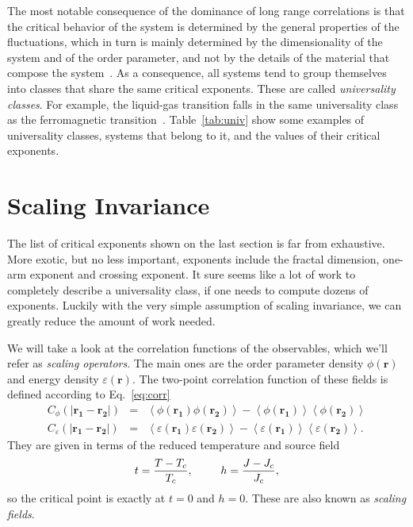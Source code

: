 The most notable consequence of the dominance of long range correlations is
that the critical behavior of the system is determined by the general
properties of the fluctuations, which in turn is mainly determined by the
dimensionality of the system and of the order parameter, and not by the details
of the material that compose the system~\cite{Stanley1999}. As a consequence,
all systems tend to group themselves into classes that share the same critical
exponents. These are called \textit{universality classes}. For example, the
liquid-gas transition falls in the same universality class as the ferromagnetic
transition~\cite{Kim1984}. Table~\ref{tab:univ} show some examples of
universality classes, systems that belong to it, and the values of their
critical exponents.




\section{Scaling Invariance}
\label{sec:scaling}
\renewcommand{\op}{\phi}

The list of critical exponents shown on the last section is far from
exhaustive. More exotic, but no less important, exponents include the fractal
dimension, one-arm exponent and crossing exponent. It sure seems like a lot of
work to completely describe a universality class, if one needs to compute
dozens of exponents. Luckily with the very simple assumption of scaling
invariance, we can greatly reduce the amount of work needed.

We will take a look at the correlation functions of the observables, which
we'll refer as \textit{scaling operators}. The main ones are the order
parameter density $\op(\mathbf{r})$ and energy density
$\varepsilon(\mathbf{r})$. The two-point correlation function of these fields is
defined according to Eq.~\ref{eq:corr}
\begin{eqnarray}
    C_{\op}\left(\left|\mathbf{r_1}-\mathbf{r_2}\right|\right) & = &
    \left\langle
        \op\left(\mathbf{r_{1}}\right)
        \op\left(\mathbf{r_{2}}\right)
    \right\rangle -
    \left\langle
        \op\left(\mathbf{r_{1}}\right)
    \right\rangle
    \left\langle
        \op\left(\mathbf{r_{2}}\right)
    \right\rangle
    \\
    C_{\varepsilon}\left(\left|\mathbf{r_1}-\mathbf{r_2}\right|\right) & = &
    \left\langle
        \varepsilon\left(\mathbf{r_{1}}\right)
        \varepsilon\left(\mathbf{r_{2}}\right)
    \right\rangle-
    \left\langle
        \varepsilon\left(\mathbf{r_{1}}\right)
    \right\rangle
    \left\langle
        \varepsilon\left(\mathbf{r_{2}}\right)
    \right\rangle.
\end{eqnarray}
They are given in terms of the reduced temperature and source field
\begin{equation}
    t=\frac{T-T_c}{T_c},\;\;\;\;\;\;\;\;\;h=\frac{J-J_c}{J_c},
\end{equation}
so the critical point is exactly at $t=0$ and $h=0$. These are also known
as \textit{scaling fields}.

